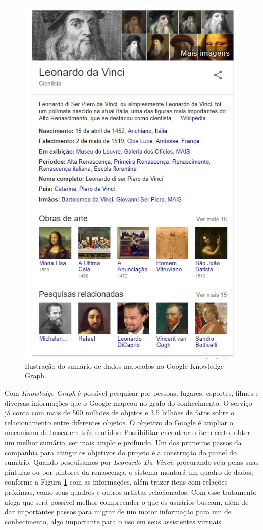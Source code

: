 \begin{figure}
	\centering
	\includegraphics[scale=0.55]{imagens/knowledge_graph.jpg}
	\caption{Ilustração do sumário de dados mapeados no Google Knowledge Graph.}
	\label{fig:knowledge-graph}
\end{figure}

Com \textit{Knowledge Graph} é possível pesquisar por pessoas, lugares, esportes, filmes e diversas informações que o Google mapeou no grafo do conhecimento. O serviço já conta com mais de 500 milhões de objetos e 3.5 bilhões de fatos sobre o relacionamento entre diferentes objetos. O objetivo do Google é ampliar o mecanismo de busca em três sentidos: Possibilitar encontrar o item certo, obter um melhor sumário, ser mais amplo e profundo. Um dos primeiros passos da companhia para atingir os objetivos do projeto é a construção do painel do sumário. Quando pesquisamos por \textit{Leonardo Da Vinci}, procurando seja pelas suas pinturas ou por pintores da renascença, o sistema montará um quadro de dados, conforme a Figura \ref{fig:knowledge-graph} com as informações, além trazer itens com relações próximas, como seus quadros e outros artistas relacionados. Com esse tratamento \cite{GoogleKnowledge} alega que será possível melhor compreender o que os usuários buscam, além de dar importantes passos para migrar de um motor informação para um de conhecimento, algo importante para o uso em seus assistentes virtuais.

